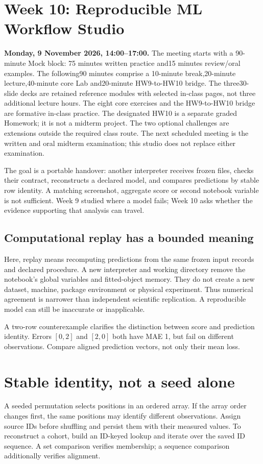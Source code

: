 
\section{Week 10: Reproducible ML Workflow Studio}
\textbf{Monday, 9 November 2026, 14:00--17:00.} The meeting starts with a 90-minute Mock block: 75 minutes written practice and15 minutes review/oral examples. The following90 minutes comprise a 10-minute break,20-minute lecture,40-minute core Lab and20-minute HW9-to-HW10 bridge. The three30-slide decks are retained reference modules with selected in-class pages, not three additional lecture hours. The eight core exercises and the HW9-to-HW10 bridge are formative in-class practice. The designated HW10 is a separate graded Homework; it is not a midterm project. The two optional challenges are extensions outside the required class route. The next scheduled meeting is the written and oral midterm examination; this studio does not replace either examination.

The goal is a portable handover: another interpreter receives frozen files, checks their contract, reconstructs a declared model, and compares predictions by stable row identity. A matching screenshot, aggregate score or second notebook variable is not sufficient. Week 9 studied where a model fails; Week 10 asks whether the evidence supporting that analysis can travel.

\subsection{Computational replay has a bounded meaning}
Here, replay means recomputing predictions from the same frozen input records and declared procedure. A new interpreter and working directory remove the notebook's global variables and fitted-object memory. They do not create a new dataset, machine, package environment or physical experiment. Thus numerical agreement is narrower than independent scientific replication. A reproducible model can still be inaccurate or inapplicable.

A two-row counterexample clarifies the distinction between score and prediction identity. Errors $[0,2]$ and $[2,0]$ both have MAE 1, but fail on different observations. Compare aligned prediction vectors, not only their mean loss.

\section{Stable identity, not a seed alone}
A seeded permutation selects positions in an ordered array. If the array order changes first, the same positions may identify different observations. Assign source IDs before shuffling and persist them with their measured values. To reconstruct a cohort, build an ID-keyed lookup and iterate over the saved ID sequence. A set comparison verifies membership; a sequence comparison additionally verifies alignment.


